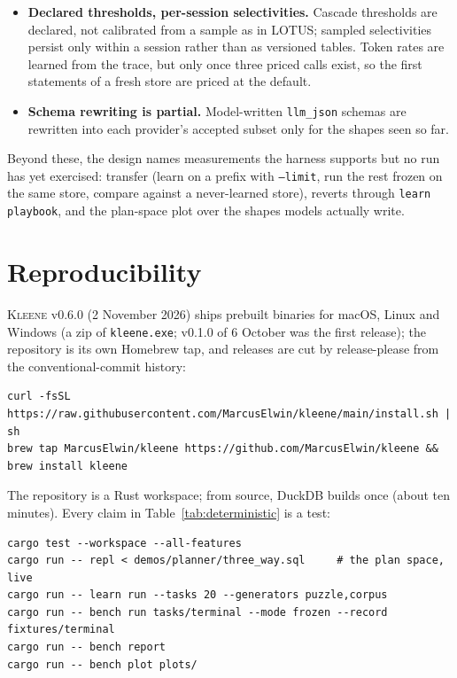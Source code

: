 \documentclass[11pt,a4paper]{article}
\newcommand{\kleene}{\textsc{Kleene}}
\newcommand{\code}[1]{\texttt{#1}}
\begin{document}
\begin{itemize}[leftmargin=1.5em,itemsep=2pt]
  any table; it is one short call per memo task, roughly a dollar a sweep.
\item \textbf{Declared thresholds, per-session selectivities.} Cascade
  thresholds are declared, not calibrated from a sample as in LOTUS;
  sampled selectivities persist only within a session rather than as
  versioned tables. Token rates are learned from the trace, but only once
  three priced calls exist, so the first statements of a fresh store are
  priced at the default.
\item \textbf{Schema rewriting is partial.} Model-written \code{llm\_json}
  schemas are rewritten into each provider's accepted subset only for the
  shapes seen so far.
\end{itemize}

Beyond these, the design names measurements the harness supports but no run
has yet exercised: transfer (learn on a prefix with \code{--limit}, run the rest
frozen on the same store, compare against a never-learned store), reverts
through \code{learn playbook}, and the plan-space plot over the shapes models
actually write.

\section{Reproducibility}
\label{sec:repro}

\kleene{} v0.6.0 (2 November 2026) ships prebuilt binaries for macOS,
Linux and Windows (a zip of \code{kleene.exe}; v0.1.0 of 6 October was the
first release); the repository is its own Homebrew tap, and releases are
cut by release-please from the conventional-commit history:

\begin{lstlisting}[language={}]
curl -fsSL https://raw.githubusercontent.com/MarcusElwin/kleene/main/install.sh | sh
brew tap MarcusElwin/kleene https://github.com/MarcusElwin/kleene && brew install kleene
\end{lstlisting}

The repository is a Rust workspace; from source, DuckDB builds once (about
ten minutes). Every claim in Table~\ref{tab:deterministic} is a test:

\begin{lstlisting}[language={}]
cargo test --workspace --all-features
cargo run -- repl < demos/planner/three_way.sql     # the plan space, live
cargo run -- learn run --tasks 20 --generators puzzle,corpus
cargo run -- bench run tasks/terminal --mode frozen --record fixtures/terminal
cargo run -- bench report
cargo run -- bench plot plots/
\end{lstlisting}
\end{document}
